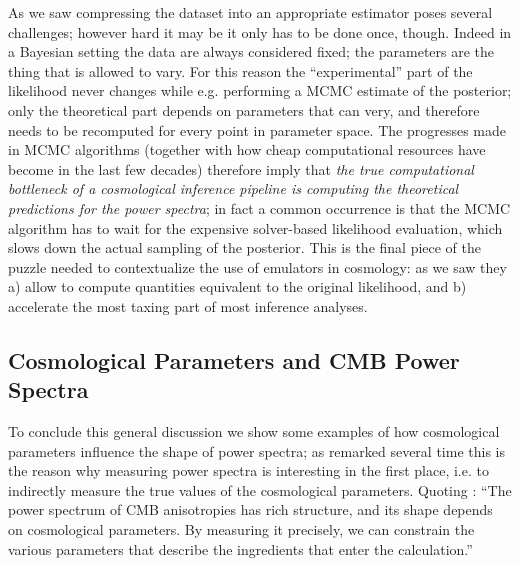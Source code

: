As we saw compressing the dataset into an appropriate estimator poses several challenges; however hard it may be it only has to be done once, though. Indeed in a Bayesian setting the data are always considered fixed; the parameters are the thing that is allowed to vary.
For this reason the ``experimental'' part of the likelihood never changes while e.g. performing a MCMC estimate of the posterior; only the theoretical part depends on parameters that can very, and therefore needs to be recomputed for every point in parameter space.
The progresses made in MCMC algorithms (together with how cheap computational resources have become in the last few decades) therefore imply that \emph{the true computational bottleneck of a cosmological inference pipeline is computing the theoretical predictions for the power spectra}; in fact a common occurrence is that the MCMC algorithm has to wait for the expensive solver-based likelihood evaluation, which slows down the actual sampling of the posterior.
This is the final piece of the puzzle needed to contextualize the use of emulators in cosmology: as we saw they a) allow to compute quantities equivalent to the original likelihood, and b) accelerate the most taxing part of most inference analyses.

\subsection{Cosmological Parameters and CMB Power Spectra}\label{subsec:figure_cmb_power_spectrum}
To conclude this general discussion we show some examples of how cosmological parameters influence the shape of power spectra; as remarked several time this is the reason why measuring power spectra is interesting in the first place, i.e. to indirectly measure the true values of the cosmological parameters. Quoting \cite{modern_cosmology}: ``The power spectrum of CMB anisotropies has rich structure, and its shape depends on cosmological parameters. By measuring it precisely, we can constrain the various parameters that describe the ingredients that enter the calculation.''

